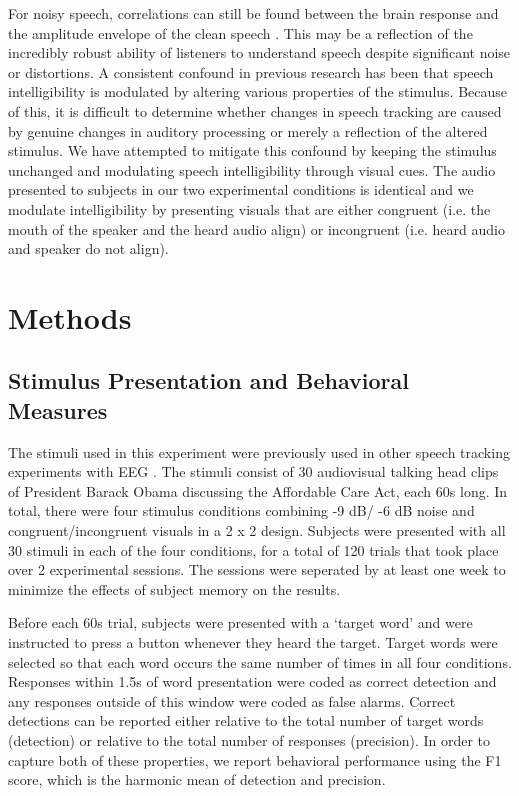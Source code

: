 \documentclass[10pt,letterpaper]{article}
\begin{document}
For noisy speech, correlations can still be found between the brain response 
and the amplitude envelope of the clean speech \cite{Ding2013,Vanthornhout2017}.
This may be a reflection of the incredibly robust ability of listeners to 
understand speech despite significant noise or distortions. A consistent 
confound in previous research has been that speech intelligibility is 
modulated by altering various properties of the stimulus. Because of this,
it is difficult to determine whether changes in speech tracking are 
caused by genuine changes in auditory processing or merely a reflection of the
altered stimulus. We have attempted to mitigate this confound by keeping 
the stimulus unchanged and modulating speech intelligibility through 
visual cues. The audio presented to subjects in our two experimental conditions
is identical and we modulate intelligibility by presenting visuals that 
are either congruent (i.e. the mouth of the speaker and the heard audio align)
or incongruent (i.e. heard audio and speaker do not align).



\section{Methods}

\subsection{Stimulus Presentation and Behavioral Measures}

  The stimuli used in this experiment were previously used in other 
  speech tracking experiments with EEG \cite{Crosse2015,Crosse2016}.
  The stimuli consist of 30 audiovisual talking head clips of President
  Barack Obama discussing the Affordable Care Act, each 60s long. In total, 
  there were four stimulus conditions combining -9 dB/ -6 dB noise and 
  congruent/incongruent visuals in a 2 x 2 design. Subjects were presented
  with all 30 stimuli in each of the four conditions, for a total of 120
  trials that took place over 2 experimental sessions. The sessions were
  seperated by at least one week to minimize the effects of subject 
  memory on the results.

  Before each 60s trial, subjects were presented with a `target word' and 
  were instructed to press a button whenever they heard the target. Target 
  words were selected so that each word occurs the same number of times
  in all four conditions. Responses within 1.5s of word presentation 
  were coded as correct detection and any responses outside of this window
  were coded as false alarms. Correct detections can be reported either 
  relative to the total number of target words (detection) or relative 
  to the total number of responses (precision). In order to capture 
  both of these properties, we report behavioral performance using the 
  F1 score, which is the harmonic mean of detection and precision.
  
\end{document}
